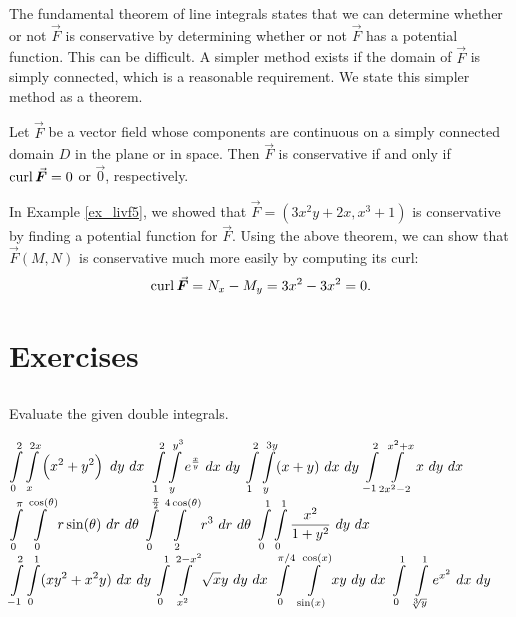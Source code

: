 The fundamental theorem of line integrals states that we can determine whether or not $\vec F$ is conservative by determining whether or not $\vec F$ has a potential function. This can be difficult. A simpler method exists if the domain of $\vec F$ is simply connected, which is a reasonable requirement. We state this simpler method as a theorem.


\begin{theorem}\label{thm:conservative_field_curl}
Let $\vec F$ be a vector field whose components are continuous on a simply connected domain $D$ in the plane or in space. Then $\vec F$ is conservative if and only if $\curl \vec F = 0$ or $\vec 0$, respectively.
\end{theorem}

In Example \ref{ex_livf5}, we showed that $\vec F =\left( 3x^2y+2x,x^3+1\right)$ is conservative by finding a potential function for $\vec F$. Using the above theorem, we can show that $\vec F(M,N)$ is conservative much more easily by computing its curl:
$$\curl \vec F = N_x - M_y = 3x^2 - 3x^2 = 0.$$



\newpage

\renewcommand{\ExerciseListName}{Assignement}
\section{Exercises}

\subsection*{}
\begin{Exercise} Evaluate the given double integrals.
    \begin{multicols}{2}
       \Question[difficulty = 1] $\displaystyle \int\limits_0^2\int\limits_{x}^{2x} \left(x^2+y^2\right)\ dy\ dx$
       \Question[difficulty = 1] $\displaystyle \int\limits_1^2\int\limits_{y}^{y^3} e^{\frac{x}{y}}\ dx\ dy$
        \Question[difficulty = 1] $\displaystyle \int\limits_1^2\int\limits_{y}^{3y} (x+y)\ dx\ dy$
        \Question[difficulty = 2] $\displaystyle \int\limits_{-1}^2\int\limits_{2x^2-2}^{x^2+x} x\ dy\ dx$
        \Question[difficulty = 2] $\ds \int\limits_{0}^{\pi}\int\limits_{0}^{\cos(\theta)} r \sin(\theta)\ dr\ d\theta$
        \Question[difficulty = 1] $\ds \int\limits_{0}^{\frac{\pi}{2}}\int\limits_{2}^{4\cos(\theta)} r^3\ dr\ d\theta$
        \Question[difficulty = 2] $\displaystyle \int\limits_{0}^1\int\limits_{0}^{1} \dfrac{x^2}{1+y^2}\ dy\ dx$
        \Question[difficulty = 2] $\displaystyle \int\limits_{-1}^{2} \int\limits_0^1 (xy^2 + x^2y)\ dx\ dy$ 
        \Question[difficulty = 2] $\displaystyle \int\limits_0^1\int\limits_{x^2}^{2-x^2} \sqrt{x}y\ dy\ dx$ 
        \Question[difficulty = 3] $\ds \int\limits_0^{\pi/4}\ \int\limits_{\sin(x)}^{\cos(x)} xy \ dy\ dx$ 
        \Question[difficulty = 3] $\ds \int\limits_0^{1}\ \int\limits_{\sqrt[3]{y}}^{1} e^{x^2} \ dx\ dy$
        \EndCurrentQuestion
    \end{multicols}
\end{Exercise}

